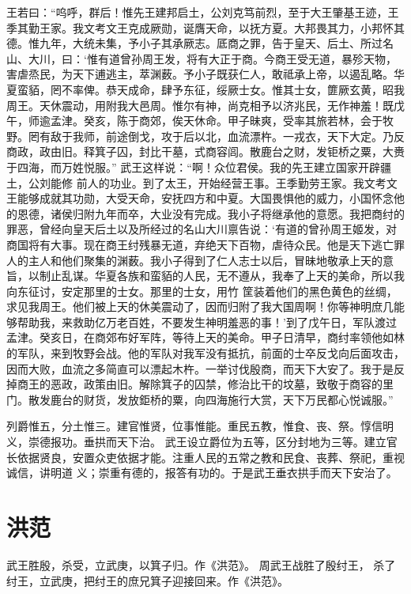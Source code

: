 \documentclass[a4paper,12pt,UTF8,twoside]{ctexbook}
\begin{document}
王若曰：“呜呼，群后！惟先王建邦启土，公刘克笃前烈，至于大王肇基王迹，王季其勤王家。我文考文王克成厥勋，诞膺天命，以抚方夏。大邦畏其力，小邦怀其德。惟九年，大统未集，予小子其承厥志。厎商之罪，告于皇天、后土、所过名山、大川，曰：‘惟有道曾孙周王发，将有大正于商。今商王受无道，暴殄天物，害虐烝民，为天下逋逃主，萃渊薮。予小子既获仁人，敢祗承上帝，以遏乱略。华夏蛮貊，罔不率俾。恭天成命，肆予东征，绥厥士女。惟其士女，篚厥玄黄，昭我周王。天休震动，用附我大邑周。惟尔有神，尚克相予以济兆民，无作神羞！既戊午，师逾孟津。癸亥，陈于商郊，俟天休命。甲子昧爽，受率其旅若林，会于牧野。罔有敌于我师，前途倒戈，攻于后以北，血流漂杵。一戎衣，天下大定。乃反商政，政由旧。释箕子囚，封比干墓，式商容闾。散鹿台之财，发钜桥之粟，大赉于四海，而万姓悦服。”
武王这样说：“啊！众位君侯。我的先王建立国家开辟疆土，公刘能修 前人的功业。到了太王，开始经营王事。王季勤劳王家。我文考文王能够成就其功勋，大受天命，安抚四方和中夏。大国畏惧他的威力，小国怀念他的恩德，诸侯归附九年而卒，大业没有完成。我小子将继承他的意愿。我把商纣的罪恶，曾经向皇天后土以及所经过的名山大川禀告说：‘有道的曾孙周王姬发，对商国将有大事。现在商王纣残暴无道，弃绝天下百物，虐待众民。他是天下逃亡罪人的主人和他们聚集的渊薮。我小子得到了仁人志士以后，冒昧地敬承上天的意旨，以制止乱谋。华夏各族和蛮貊的人民，无不遵从，我奉了上天的美命，所以我向东征讨，安定那里的士女。那里的士女，用竹 筐装着他们的黑色黄色的丝绸，求见我周王。他们被上天的休美震动了，因而归附了我大国周啊！你等神明庶几能够帮助我，来救助亿万老百姓，不要发生神明羞恶的事！’到了戊午日，军队渡过孟津。癸亥日，在商郊布好军阵，等待上天的美命。甲子日清早，商纣率领他如林的军队，来到牧野会战。他的军队对我军没有抵抗，前面的士卒反戈向后面攻击，因而大败，血流之多简直可以漂起木杵。一举讨伐殷商，而天下大安了。我于是反掉商王的恶政，政策由旧。解除箕子的囚禁，修治比干的坟墓，致敬于商容的里门。散发鹿台的财货，发放鉅桥的粟，向四海施行大赏，天下万民都心悦诚服。”

列爵惟五，分土惟三。建官惟贤，位事惟能。重民五教，惟食、丧、祭。惇信明义，崇德报功。垂拱而天下治。
武王设立爵位为五等，区分封地为三等。建立官长依据贤良，安置众吏依据才能。注重人民的五常之教和民食、丧葬、祭祀，重视诚信，讲明道 义；崇重有德的，报答有功的。于是武王垂衣拱手而天下安治了。

\chapter{洪范}

武王胜殷，杀受，立武庚，以箕子归。作《洪范》。
周武王战胜了殷纣王， 杀了纣王，立武庚，把纣王的庶兄箕子迎接回来。作《洪范》。
\end{document}
